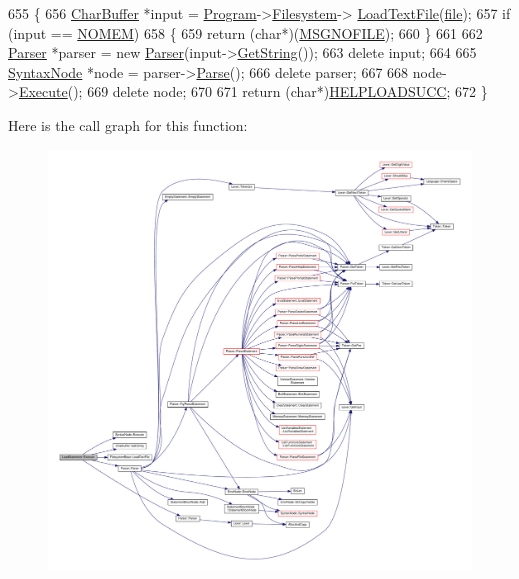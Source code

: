 \begin{DoxyCode}
655 \{
656     \hyperlink{classCharBuffer}{CharBuffer} *input = \hyperlink{classProgram}{Program}->\hyperlink{classProgram_a54fb0dc3ee40a356fe91cea64e569b26}{Filesystem}->
      \hyperlink{classFilesystemBase_adc4a9e1dc189bcd221e3b994bc854d46}{LoadTextFile}(\hyperlink{classLoadStatement_acfe90dcc5509b0f26a52ef742362d46b}{file});
657     \textcolor{keywordflow}{if} (input == \hyperlink{platform_8h_a46ff2bfbf0d44b8466a2251d5bd5e6f8}{NOMEM})
658     \{
659         \textcolor{keywordflow}{return} (\textcolor{keywordtype}{char}*)(\hyperlink{text_8h_ae0de195e949c617eb8a792aeb4d4574e}{MSGNOFILE});
660     \}
661 
662     \hyperlink{classParser}{Parser} *parser = \textcolor{keyword}{new} \hyperlink{classParser}{Parser}(input->\hyperlink{classCharBuffer_a7dfd3feaaf80f318ba44efe15b1ec44b}{GetString}());
663     \textcolor{keyword}{delete} input;
664 
665     \hyperlink{classSyntaxNode}{SyntaxNode} *node = parser->\hyperlink{classParser_a1861d1d9cc6165970cf07e07cacd11df}{Parse}();
666     \textcolor{keyword}{delete} parser;
667 
668     node->\hyperlink{classSyntaxNode_ad8418608fa224536b48a590c87f0a509}{Execute}();
669     \textcolor{keyword}{delete} node;
670 
671     \textcolor{keywordflow}{return} (\textcolor{keywordtype}{char}*)\hyperlink{text_8h_a5d4eccd5e4d8c6e6ce4e1563a01c7873}{HELPLOADSUCC};
672 \}
\end{DoxyCode}


Here is the call graph for this function\+:\nopagebreak
\begin{figure}[H]
\begin{center}
\leavevmode
\includegraphics[width=350pt]{classLoadStatement_ae3cbd157ad8de73551ff430fa3c089d9_cgraph}
\end{center}
\end{figure}




